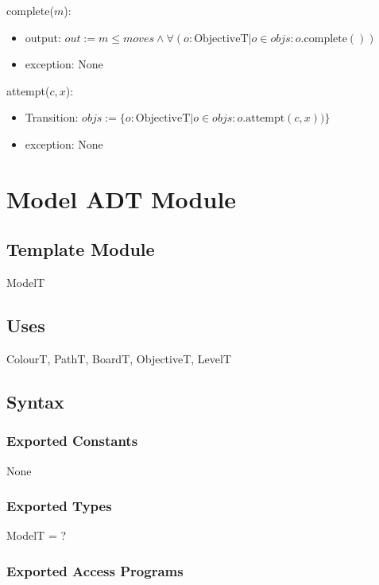 \documentclass[12pt]{article}
\begin{document}
\noindent complete($m$):
\begin{itemize}
	\item output: $out := m \le moves \land \forall(o : \mbox{ObjectiveT} | o \in objs : o.\mbox{complete}())$
	\item exception: None
\end{itemize}

\noindent attempt($c, x$):
\begin{itemize}
	\item Transition: $objs := \{ o : \mbox{ObjectiveT} | o \in objs : o.\mbox{attempt}(c, x)) \}$
	\item exception: None
\end{itemize}

\newpage

\section* {Model ADT Module}

\subsection*{Template Module}

ModelT

\subsection* {Uses}

ColourT, PathT, BoardT, ObjectiveT, LevelT

\subsection* {Syntax}

\subsubsection* {Exported Constants}

None

\subsubsection* {Exported Types}

ModelT = ?

\subsubsection* {Exported Access Programs}
\end{document}
